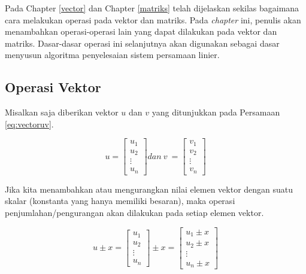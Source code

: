 \documentclass[
]{book}
\theoremstyle{definition}
\theoremstyle{definition}
\theoremstyle{definition}
\theoremstyle{definition}
\theoremstyle{remark}
\begin{document}
Pada Chapter \ref{vector} dan Chapter \ref{matriks} telah dijelaskan sekilas bagaimana cara melakukan operasi pada vektor dan matriks. Pada \emph{chapter} ini, penulis akan menambahkan operasi-operasi lain yang dapat dilakukan pada vektor dan matriks. Dasar-dasar operasi ini selanjutnya akan digunakan sebagai dasar menyusun algoritma penyelesaian sistem persamaan linier.

\hypertarget{operasivektor}{%
\subsection{Operasi Vektor}\label{operasivektor}}

Misalkan saja diberikan vektor \(u\) dan \(v\) yang ditunjukkan pada Persamaan \eqref{eq:vectoruv}.

\begin{equation}
u = \begin{bmatrix}
      u_1            \\[0.3em]
      u_2            \\[0.3em]
      \vdots         \\[0.3em] 
      u_n
     \end{bmatrix}
dan\ v\ = \begin{bmatrix}
      v_1            \\[0.3em]
      v_2            \\[0.3em]
      \vdots         \\[0.3em] 
      v_n
     \end{bmatrix}
  \label{eq:vectoruv}
\end{equation}

Jika kita menambahkan atau mengurangkan nilai elemen vektor dengan suatu skalar (konstanta yang hanya memiliki besaran), maka operasi penjumlahan/pengurangan akan dilakukan pada setiap elemen vektor.

\begin{equation}
u \pm x = \begin{bmatrix}
      u_1            \\[0.3em]
      u_2            \\[0.3em]
      \vdots         \\[0.3em] 
      u_n
     \end{bmatrix}
\pm x = \begin{bmatrix}
      u_1 \pm x            \\[0.3em]
      u_2 \pm x           \\[0.3em]
      \vdots         \\[0.3em] 
      u_n \pm x
     \end{bmatrix}
     \label{eq:addvector}
\end{equation}
\end{document}
